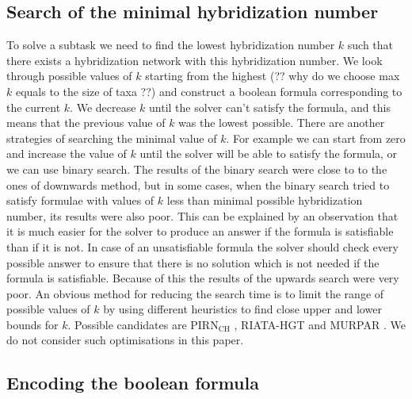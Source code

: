 \documentclass[runningheads, envcountsame, a4paper]{llncs}
\begin{document}
\subsection{Search of the minimal hybridization number}

To solve a subtask we need to find the lowest hybridization number $k$ such that there exists a hybridization 
network with this hybridization number. We look through possible values of $k$ starting from the highest (?? why do 
we choose max $k$ equals to the size of taxa ??) and construct a boolean formula corresponding to the current $k$. 
We decrease $k$ until the solver can't satisfy the formula, and this means that the previous value of $k$ was the 
lowest possible. There are another strategies of searching the minimal value of $k$. For example we can start from 
zero and increase the value of $k$ until the solver will be able to satisfy the formula, or we can use binary search. 
The results of the binary search were close to to the ones of downwards method, 
but in some cases, when the binary search tried to satisfy formulae with values of $k$ less than minimal possible hybridization number, 
its results were also poor. 
This can be explained by an observation that it is much easier for the solver to produce an answer if the formula is satisfiable than if it is not. 
In case of an unsatisfiable formula the solver should check every possible answer to ensure that there is no solution which is not needed if the 
formula is satisfiable. Because of this the results of the upwards search were very poor. An obvious method 
for reducing the search time is to limit the range of possible values of $k$ by using different heuristics to find close upper and lower bounds for $k$. 
Possible candidates are PIRN$\mathrm{_{CH}}$ \cite{wu2013algorithm}, RIATA-HGT \cite{nakhleh2005riata} and MURPAR \cite{park2012murpar}. We do not consider such optimisations in this paper.

\subsection{Encoding the boolean formula}
\end{document}

